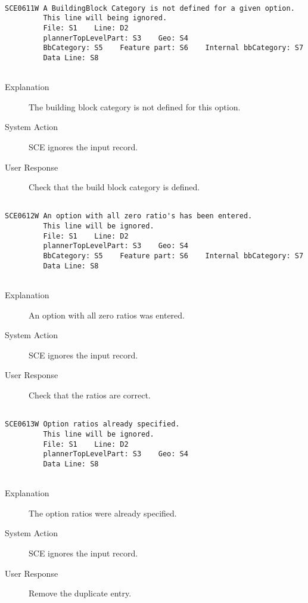 \hrulefill
\begin{verbatim}

SCE0611W A BuildingBlock Category is not defined for a given option.
         This line will being ignored.
         File: S1    Line: D2
         plannerTopLevelPart: S3    Geo: S4
         BbCategory: S5    Feature part: S6    Internal bbCategory: S7
         Data Line: S8
         
\end{verbatim}
\begin{description}
\item[Explanation]  The building block category is not defined for this option.

\item[System Action]  SCE ignores the input record.

\item[User Response]  Check that the build block category is defined.
\end{description}
\hrulefill
\begin{verbatim}

SCE0612W An option with all zero ratio's has been entered.
         This line will be ignored.
         File: S1    Line: D2
         plannerTopLevelPart: S3    Geo: S4
         BbCategory: S5    Feature part: S6    Internal bbCategory: S7
         Data Line: S8
         
\end{verbatim}
\begin{description}
\item[Explanation]  An option with all zero ratios was entered.

\item[System Action]  SCE ignores the input record.

\item[User Response]  Check that the ratios are correct.
\end{description}
\hrulefill
\begin{verbatim}

SCE0613W Option ratios already specified.
         This line will be ignored.
         File: S1    Line: D2
         plannerTopLevelPart: S3    Geo: S4
         Data Line: S8
         
\end{verbatim}
\begin{description}
\item[Explanation]  The option ratios were already specified.

\item[System Action]  SCE ignores the input record.

\item[User Response]  Remove the duplicate entry.
\end{description}
